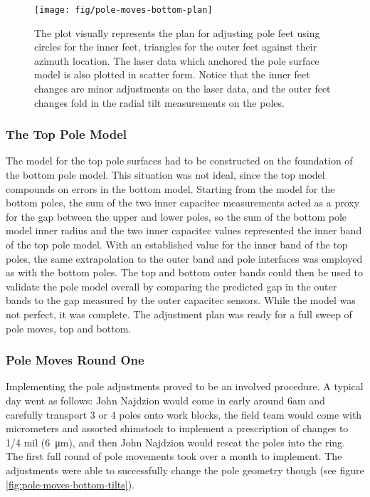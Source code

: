 \begin{figure}
\centering
\texttt{[image: fig/pole-moves-bottom-plan]}
\caption{
    The plot visually represents the plan for adjusting pole feet using circles for the inner feet, triangles for the outer feet against their azimuth location.  The laser data which anchored the pole surface model is also plotted in scatter form.  Notice that the inner feet changes are minor adjustments on the laser data, and the outer feet changes fold in the radial tilt measurements on the poles.
    \label{fig:bottom-pole-adjustment-plan}
}
\end{figure}

\subsubsection{The Top Pole Model}

The model for the top pole surfaces had to be constructed on the foundation of the bottom pole model.  This situation was not ideal, since the top model compounds on errors in the bottom model.  Starting from the model for the bottom poles, the sum of the two inner capacitec measurements acted as a proxy for the gap between the upper and lower poles, so the sum of the bottom pole model inner radius and the two inner capacitec values represented the inner band of the top pole model.  With an established value for the inner band of the top poles, the same extrapolation to the outer band and pole interfaces was employed as with the bottom poles.  The top and bottom outer bands could then be used to validate the pole model overall by comparing the predicted gap in the outer bands to the gap measured by the outer capacitec sensors.  While the model was not perfect, it was complete.  The adjustment plan was ready for a full sweep of pole moves, top and bottom.


\subsubsection{Pole Moves Round One}

Implementing the pole adjustments proved to be an involved procedure.  A typical day went as follows: John Najdzion would come in early around 6am and carefully transport 3 or 4 poles onto work blocks, the field team would come with micrometers and assorted shimstock to implement a prescription of changes to 1/4 mil (\SI{6}{\micro\meter}), and then John Najdzion would reseat the poles into the ring.  The first full round of pole movements took over a month to implement.  The adjustments were able to successfully change the pole geometry though (see figure \ref{fig:pole-moves-bottom-tilts}).

